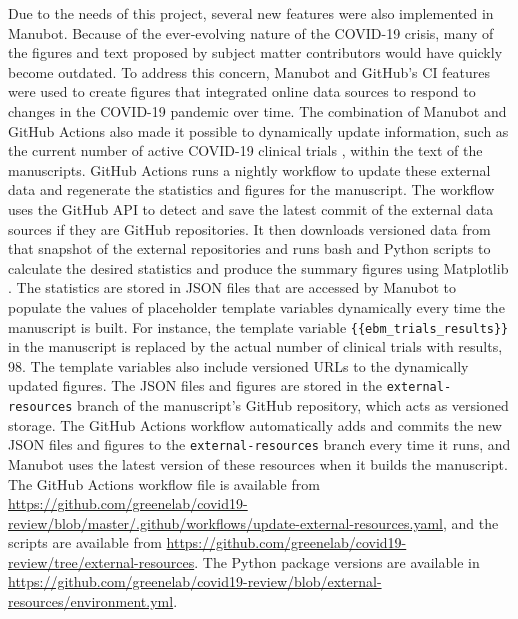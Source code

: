 \documentclass[twocolumn]{ceurart}
\begin{document}
Due to the needs of this project, several new features were also implemented in Manubot.
Because of the ever-evolving nature of the COVID-19 crisis, many of the figures and text proposed by subject matter contributors would have quickly become outdated.
To address this concern, Manubot and GitHub's CI features were used to create figures that integrated online data sources to respond to changes in the COVID-19 pandemic over time.
The combination of Manubot and GitHub Actions also made it possible to dynamically update information, such as the current number of active COVID-19 clinical trials \citep{cifK9B8t}, within the text of the manuscripts.
GitHub Actions runs a nightly workflow to update these external data and regenerate the statistics and figures for the manuscript.
The workflow uses the GitHub API to detect and save the latest commit of the external data sources if they are GitHub repositories.
It then downloads versioned data from that snapshot of the external repositories and runs bash and Python scripts to calculate the desired statistics and produce the summary figures using Matplotlib \citep{1026Gxdsi}.
The statistics are stored in JSON files that are accessed by Manubot to populate the values of placeholder template variables dynamically every time the manuscript is built.
For instance, the template variable \texttt{\{\{ebm\_trials\_results\}\}} in the manuscript is replaced by the actual number of clinical trials with results, 98.
The template variables also include versioned URLs to the dynamically updated figures.
The JSON files and figures are stored in the \texttt{external-resources} branch of the manuscript's GitHub repository, which acts as versioned storage.
The GitHub Actions workflow automatically adds and commits the new JSON files and figures to the \texttt{external-resources} branch every time it runs, and Manubot uses the latest version of these resources when it builds the manuscript.
The GitHub Actions workflow file is available from \url{https://github.com/greenelab/covid19-review/blob/master/.github/workflows/update-external-resources.yaml}, and the scripts are available from \url{https://github.com/greenelab/covid19-review/tree/external-resources}.
The Python package versions are available in \url{https://github.com/greenelab/covid19-review/blob/external-resources/environment.yml}.
\end{document}
